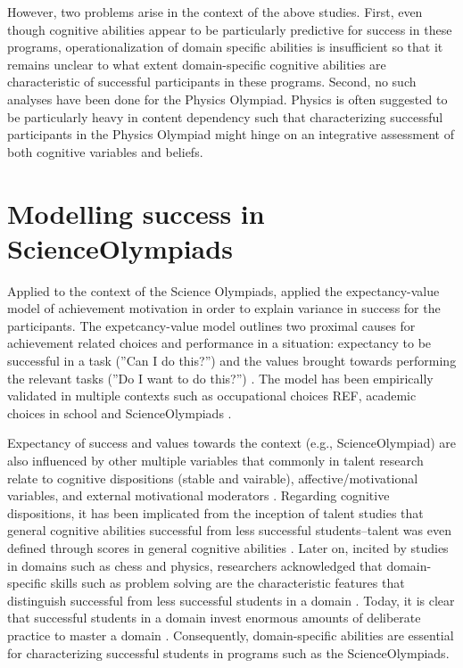 \documentclass[]{interact}
\begin{document}
However, two problems arise in the context of the above studies. First, even though cognitive abilities appear to be particularly predictive for success in these programs, operationalization of domain specific abilities is insufficient so that it remains unclear to what extent domain-specific cognitive abilities are characteristic of successful participants in these programs. Second, no such analyses have been done for the Physics Olympiad. Physics is often suggested to be particularly heavy in content dependency such that characterizing successful participants in the Physics Olympiad might hinge on an integrative assessment of both cognitive variables and beliefs.


\section{Modelling success in ScienceOlympiads}

Applied to the context of the Science Olympiads, \cite{Urhahne.2012} applied the expectancy-value model of achievement motivation in order to explain variance in success for the participants. The expetcancy-value model outlines two proximal causes for achievement related choices and performance in a situation: expectancy to be successful in a task (''Can I do this?'') and the values brought towards performing the relevant tasks (''Do I want to do this?'') \citep{Eccles.1983}. The model has been empirically validated in multiple contexts such as occupational choices REF, academic choices in school \citep{Koller.2000} and ScienceOlympiads \citep{Urhahne.2012}. 

Expectancy of success and values towards the context (e.g., ScienceOlympiad) are also influenced by other multiple variables that commonly in talent research relate to cognitive dispositions (stable and vairable), affective/motivational variables, and external motivational moderators \citep[e.g.,][]{Ziegler.2009,Heller.2002}. Regarding cognitive dispositions, it has been implicated from the inception of talent studies that general cognitive abilities successful from less successful students--talent was even defined through scores in general cognitive abilities \citep{Rost.2010}. Later on, incited by studies in domains such as chess and physics, researchers acknowledged that domain-specific skills such as problem solving are the characteristic features that distinguish successful from less successful students in a domain \citep{Chi.1981}. Today, it is clear that successful students in a domain invest enormous amounts of deliberate practice to master a domain \citep{Simon.1983}. Consequently, domain-specific abilities are essential for characterizing successful students in programs such as the ScienceOlympiads. 
\end{document}

